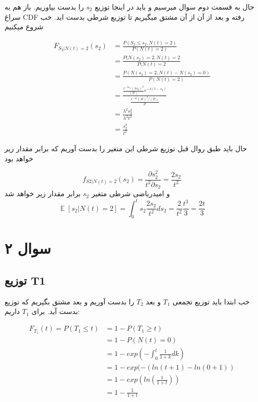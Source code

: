 \documentclass{article}[12pt]
\DeclareMathOperator{\EX}{\mathbb{E}}%
\begin{document}
حال به قسمت دوم سوال میرسیم و باید در اینجا توزیع 
$s_2$
را بدست بیاوریم. 
باز هم به سراغ CDF رفته 
و بعد از آن از آن مشتق میگیریم تا توزیع شرطی بدست اید. 
خب شروع میکنیم


\begin{equation}
\begin{split}
F_{S_2|N(t)=2}(s_2) &= 
\frac{
P(S_2 \leq s_2 , N(t) = 2)}
{
P(N(t)=2)
}
\\& = 
\frac{P(N(s_2)=2, N(t)=2}{P(N(t)=2}
\\& = 
\frac{P(N(s_2)=2 , N(t)-N(s_2)=0)}{P(N(t)=2)}
\\& = 
\frac{
\frac{ e^{-\lambda s_2 }(\lambda s_2)^2}{(2!)} 
e^{-\lambda (t-s_2)} 
}
{
\frac{
e ^ {-\lambda t} (\lambda t)^2 / (2!)
} {2!}
} \\ &= 
\frac{\lambda ^2 s_2^2 }{\lambda ^2 t^2} \\
& = \frac{s_2^2}{t^2}
\end{split}
\end{equation}

حال باید طبق روال قبل توزیع شرطی این متغیر را بدست آوریم که برابر مقدار زیر خواهد بود

\begin{equation}
f_{S2|N(t)=2}(s_2) = \frac{\partial s_2^2}{t^2 \partial s_2} = 
\frac{2 s_2}{t^2}
\end{equation}
و امیدریاضی 
شرطی متغیر 
$s_2$
برابر مقدار زیر خواهد شد
\begin{equation}
\EX[s_2 | N(t)=2] = 
\int_0^t s_2 \frac{2 s_2 }{t^2} ds_2= 
\frac{2}{t^2} \frac{t^3}{3} = \frac{2t}{3}
\end{equation}
\section{سوال ۲
}
\subsection{توزیع T1}

خب ابتدا باید توزیع تجمعی 
$T_1$ 
و بعد 
$T_2$
را بدست آوریم و بعد مشتق بگیریم که توزیع بدست آید. 
برای 
$T_1$
داریم:


\begin{equation}
\begin{split}
F_{T_1}(t) = P(T_1 \leq t) &= 1-P(T_1 \geq t)
\\
&= 1- P(N(t) = 0) 
\\
&= 
1- exp(-\int_0^t \frac{1}{1+k}dk) 
\\
&= 1- exp(-(ln(t+1)-ln(0+1))
\\
&= 1- exp(ln(\frac{1}{1+t}))
\\
&= 1 - \frac{1}{1+t}
\end{split}
\end{equation}
\end{document}
